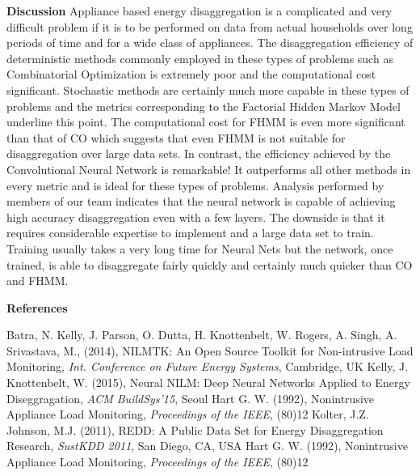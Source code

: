 \documentclass[landscape,fontscale=0.48,margin=2cm,paperwidth=135truecm,paperheight=89truecm]{baposter}
\begin{document}
\begin{poster}
%
\begin{posterbox}[column=3,below=auto]{\LARGE \bfseries Discussion}
Appliance based energy disaggregation is a complicated and very difficult problem if it is to be performed on data from actual households over long periods of time and for a wide class of appliances. The disaggregation efficiency of deterministic methods commonly employed in these types of problems such as Combinatorial Optimization is extremely poor and the computational cost significant. Stochastic methods are certainly much more capable in these types of problems and the metrics corresponding to the Factorial Hidden Markov Model underline this point. The computational cost for FHMM is even more significant than that of CO which suggests that even FHMM is not suitable for disaggregation over large data sets. In contrast, the efficiency achieved by the Convolutional Neural Network is remarkable! It outperforms all other methods in every metric and is ideal for these types of problems. Analysis performed by members of our team indicates that the neural network is capable of achieving high accuracy disaggregation even with a few layers. The downside is that it requires considerable expertise to implement and a large data set to train. Training usually takes a very long time for Neural Nets but the network, once trained, is able to disaggregate fairly quickly and certainly much quicker than CO and FHMM.
\end{posterbox}



%
\begin{posterbox}[column=3,below=auto,height = bottom]{\LARGE \bfseries References}
\footnotesize
\begin{thebibliography}{9999}
Batra, N. Kelly, J. Parson, O. Dutta, H. Knottenbelt, W. Rogers, A. Singh, A. Srivastava, M., (2014), NILMTK: An Open Source Toolkit for Non-intrusive Load Monitoring, \textit{Int. Conference on Future Energy Systems}, Cambridge, UK
Kelly, J. Knottenbelt, W. (2015), Neural NILM: Deep Neural Networks Applied to Energy Diseggragation, \textit{ACM BuildSys'15}, Seoul
Hart G. W. (1992), Nonintrusive Appliance Load Monitoring, \textit{Proceedings of the IEEE}, (80)12
Kolter, J.Z. Johnson, M.J. (2011), REDD: A Public Data Set for Energy Disaggregation Research, \textit{SustKDD 2011}, San Diego, CA, USA
Hart G. W. (1992), Nonintrusive Appliance Load Monitoring, \textit{Proceedings of the IEEE}, (80)12
\end{thebibliography}
\end{posterbox}
\end{poster}
\end{document}

